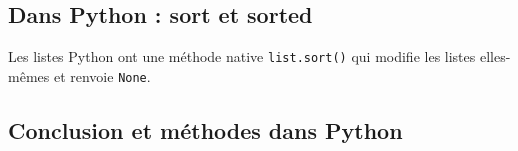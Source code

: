\subsection{Dans Python : sort et sorted}
Les listes Python ont une méthode native \texttt{list.sort()} qui modifie les listes elles-mêmes et renvoie \texttt{None}.
%
%
%
%
%
%
%
%		
%
%
%


\subsection{Conclusion et méthodes dans Python}


